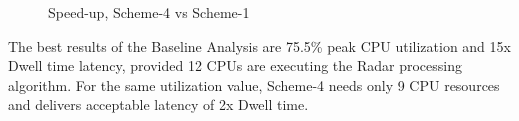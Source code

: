 \begin{figure}[h!]
\centering
\caption{Speed-up, Scheme-4 vs Scheme-1}
\label{mm:scheme5_speedup}
\end{figure}

The best results of the Baseline Analysis are 75.5\% peak CPU utilization and 15x Dwell time latency, provided 12 CPUs are executing the Radar processing algorithm. For the same utilization value, Scheme-4 needs only 9 CPU resources and delivers acceptable latency of 2x Dwell time.

